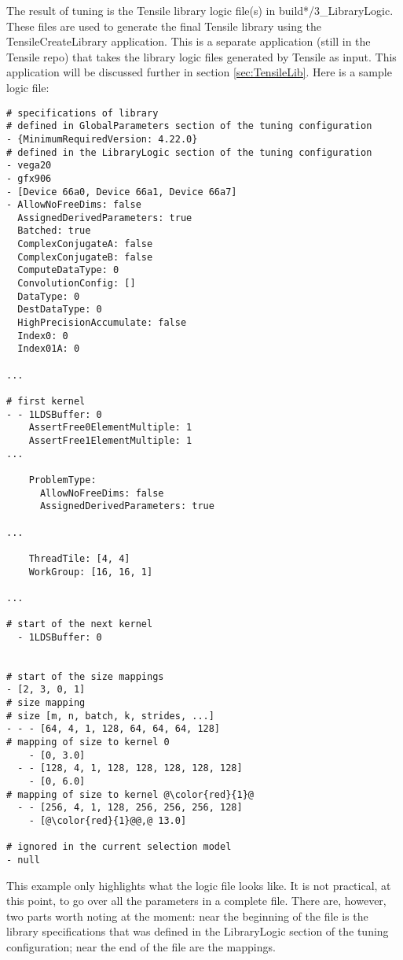 \documentclass[]{article}
\begin{document}
\noindent
The result of tuning is the Tensile library logic file(s) in build*/3\_LibraryLogic. These files are used to generate the final Tensile library using the TensileCreateLibrary application. This is a separate application (still in the Tensile repo) that takes the library logic files generated by Tensile as input. This application will be discussed further in section \ref{sec:TensileLib}. Here is a sample logic file:

\begin{verbatim}
# specifications of library
# defined in GlobalParameters section of the tuning configuration
- {MinimumRequiredVersion: 4.22.0}
# defined in the LibraryLogic section of the tuning configuration
- vega20
- gfx906
- [Device 66a0, Device 66a1, Device 66a7]
- AllowNoFreeDims: false
  AssignedDerivedParameters: true
  Batched: true
  ComplexConjugateA: false
  ComplexConjugateB: false
  ComputeDataType: 0
  ConvolutionConfig: []
  DataType: 0
  DestDataType: 0
  HighPrecisionAccumulate: false
  Index0: 0
  Index01A: 0

...

# first kernel
- - 1LDSBuffer: 0
    AssertFree0ElementMultiple: 1
    AssertFree1ElementMultiple: 1
...

    ProblemType:
      AllowNoFreeDims: false
      AssignedDerivedParameters: true

...

    ThreadTile: [4, 4]
    WorkGroup: [16, 16, 1]

...

# start of the next kernel
  - 1LDSBuffer: 0


# start of the size mappings
- [2, 3, 0, 1]
# size mapping
# size [m, n, batch, k, strides, ...]
- - - [64, 4, 1, 128, 64, 64, 64, 128]
# mapping of size to kernel 0
    - [0, 3.0]
  - - [128, 4, 1, 128, 128, 128, 128, 128]
    - [0, 6.0]
# mapping of size to kernel @\color{red}{1}@
  - - [256, 4, 1, 128, 256, 256, 256, 128]
    - [@\color{red}{1}@@,@ 13.0]

# ignored in the current selection model
- null

\end{verbatim}
\noindent
This example only highlights what the logic file looks like. It is not practical, at this point, to go over all the parameters in a complete file. There are, however, two parts worth noting at the moment: near the beginning of the file is the library specifications that was defined in the LibraryLogic section of the tuning configuration; near the end of the file are the mappings.
\end{document}

